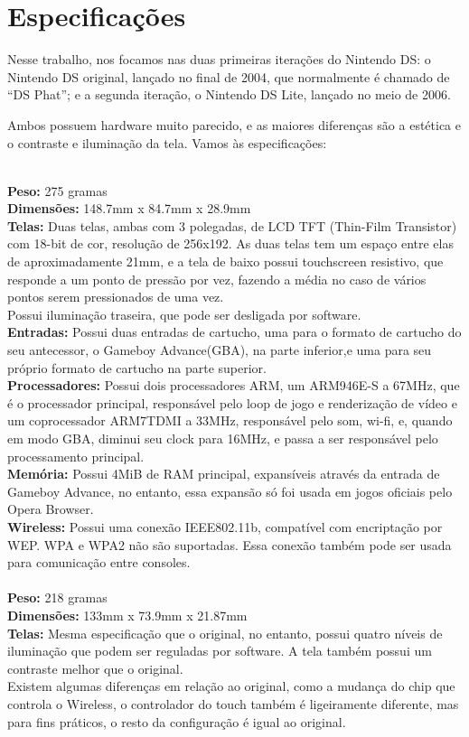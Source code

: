 \documentclass[brazil]{abnt}
\begin{document}
\section{Especificações}

Nesse trabalho, nos focamos nas duas primeiras iterações do Nintendo DS: o Nintendo DS original, lançado no final de 2004, que normalmente é chamado de ``DS Phat''; e a segunda iteração, o Nintendo DS Lite, lançado no meio de 2006.

Ambos possuem hardware muito parecido, e as maiores diferenças são a estética e o contraste e iluminação da tela. Vamos às especificações:

\\
{\bf Peso:} 275 gramas\\
{\bf Dimensões:} 148.7mm x 84.7mm x 28.9mm\\
{\bf Telas:} Duas telas, ambas com 3 polegadas, de LCD TFT (Thin-Film Transistor) com 18-bit de cor, resolução de 256x192. As duas telas tem um espaço entre elas de aproximadamente 21mm, e a tela de baixo possui touchscreen resistivo, que responde a um ponto de pressão por vez, fazendo a média no caso de vários pontos serem pressionados de uma vez.\\
Possui iluminação traseira, que pode ser desligada por software.\\
{\bf Entradas:} Possui duas entradas de cartucho, uma para o formato de cartucho do seu antecessor, o Gameboy Advance(GBA), na parte inferior,e uma para seu próprio formato de cartucho na parte superior.\\
{\bf Processadores:} Possui dois processadores ARM, um ARM946E-S a 67MHz, que é o processador principal, responsável pelo loop de jogo e renderização de vídeo e um coprocessador ARM7TDMI a 33MHz, responsável pelo som, wi-fi, e, quando em modo GBA, diminui seu clock para 16MHz, e passa a ser responsável pelo processamento principal.\\
{\bf Memória:} Possui 4MiB de RAM principal, expansíveis através da entrada de Gameboy Advance, no entanto, essa expansão só foi usada em jogos oficiais pelo Opera Browser.\\
{\bf Wireless:} Possui uma conexão IEEE802.11b, compatível com encriptação por WEP. WPA e WPA2 não são suportadas. Essa conexão também pode ser usada para comunicação entre consoles.\\

\\
{\bf Peso:} 218 gramas\\
{\bf Dimensões:} 133mm x 73.9mm x 21.87mm\\
{\bf Telas:} Mesma especificação que o original, no entanto, possui quatro níveis de iluminação que podem ser reguladas por software. A tela também possui um contraste melhor que o original.\\
Existem algumas diferenças em relação ao original, como a mudança do chip que controla o Wireless, o controlador do touch também é ligeiramente diferente, mas para fins práticos, o resto da configuração é igual ao original.
\end{document}
